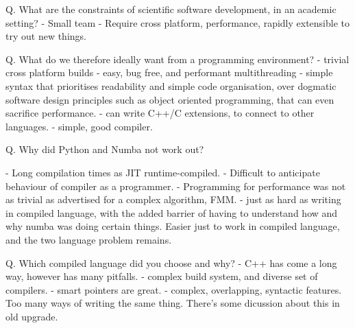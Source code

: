 
Q. What are the constraints of scientific software development, in an academic setting?
    - Small team
    - Require cross platform, performance, rapidly extensible to try out new things.

Q. What do we therefore ideally want from a programming environment?
    - trivial cross platform builds
    - easy, bug free, and performant multithreading
    - simple syntax that prioritises readability and simple code organisation, over dogmatic software design principles such as object oriented programming, that can even sacrifice performance.
    - can write C++/C extensions, to connect to other languages.
    - simple, good compiler.

Q. Why did Python and Numba not work out?

    - Long compilation times as JIT runtime-compiled.
    - Difficult to anticipate behaviour of compiler as a programmer.
    - Programming for performance was not as trivial as
    advertised for a complex algorithm, FMM.
    - just as hard as writing in compiled language, with the added barrier of having to understand how and why numba was doing certain things. Easier just to work in compiled language, and the two language problem remains.

Q. Which compiled language did you choose and why?
    - C++ has come a long way, however has many pitfalls.
        - complex build system, and diverse set of compilers.
        - smart pointers are great.
        - complex, overlapping, syntactic features. Too many ways of writing the same thing. There's some dicussion about this in old upgrade.

